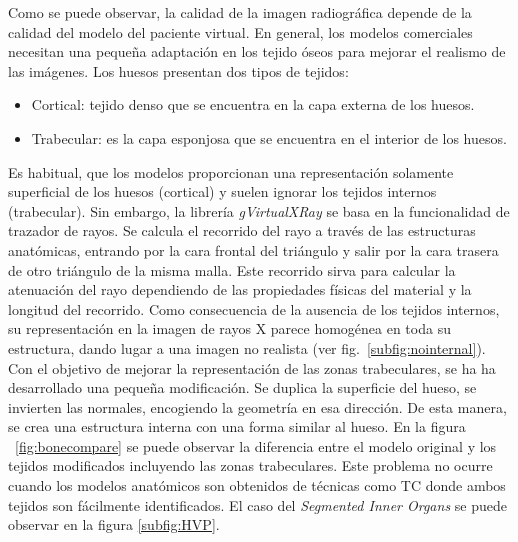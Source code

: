Como se puede observar, la calidad de la imagen radiográfica depende de la calidad del modelo del paciente virtual. En general, los modelos comerciales necesitan una pequeña adaptación en los tejido óseos para mejorar el realismo de las imágenes. Los huesos presentan dos tipos de tejidos: 
\begin{itemize}
    \item Cortical: tejido denso que se encuentra en la capa externa de los huesos.
    \item Trabecular: es la capa esponjosa que se encuentra en el interior de los huesos.
\end{itemize}

Es habitual, que los modelos proporcionan una representación solamente superficial de los huesos (cortical) y suelen ignorar los tejidos internos (trabecular). Sin embargo, la librería \emph{gVirtualXRay} se basa en la funcionalidad de trazador de rayos. Se calcula el recorrido del rayo a través de las estructuras anatómicas, entrando por la cara frontal del triángulo y salir por la cara trasera de otro triángulo de la misma malla. Este recorrido sirva para calcular la atenuación del rayo dependiendo de las propiedades físicas del material y la longitud del recorrido. Como consecuencia de la ausencia de los tejidos internos, su representación en la imagen de rayos X parece homogénea en toda su estructura, dando lugar a una imagen no realista (ver fig.~\ref{subfig:nointernal}). Con el objetivo de mejorar la representación de las zonas trabeculares, se ha ha desarrollado una pequeña modificación. Se duplica la superficie del hueso, se invierten las normales, encogiendo la geometría en esa dirección. De esta manera, se crea una estructura interna con una forma similar al hueso. En la figura ~\ref{fig:bonecompare} se puede observar la diferencia entre el modelo original y los tejidos modificados incluyendo las zonas trabeculares. Este problema no ocurre cuando los modelos anatómicos son obtenidos de técnicas como \ac{TC} donde ambos tejidos son fácilmente identificados. El caso del  
\emph{Segmented Inner Organs}\cite{VoxelMan} se puede observar en la figura \ref{subfig:HVP}.




